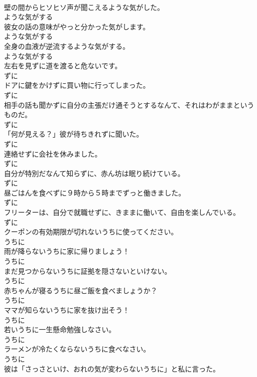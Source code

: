 \documentclass[8pt]{extreport}
\begin{document}
\begin{CJK}{UTF8}{min}
\\	壁の間からヒソヒソ声が聞こえるような気がした。	
\\	ような気がする	
\\	彼女の話の意味がやっと分かった気がします。	
\\	ような気がする	
\\	全身の血液が逆流するような気がする。	
\\	ような気がする	
\\	左右を見ずに道を渡ると危ないです。	
\\	ずに	
\\	ドアに鍵をかけずに買い物に行ってしまった。	
\\	ずに	
\\	相手の話も聞かずに自分の主張だけ通そうとするなんて、それはわがままというものだ。	
\\	ずに	
\\	「何が見える？」彼が待ちきれずに聞いた。	
\\	ずに	
\\	連絡せずに会社を休みました。	
\\	ずに	
\\	自分が特別だなんて知らずに、赤ん坊は眠り続けている。	
\\	ずに	
\\	昼ごはんを食べずに９時から５時までずっと働きました。	
\\	ずに	
\\	フリーターは、自分で就職せずに、きままに働いて、自由を楽しんでいる。	
\\	ずに	
\\	クーポンの有効期限が切れないうちに使ってください。	
\\	うちに	
\\	雨が降らないうちに家に帰りましょう！	
\\	うちに	
\\	まだ見つからないうちに証拠を隠さないといけない。	
\\	うちに	
\\	赤ちゃんが寝るうちに昼ご飯を食べましょうか？	
\\	うちに	
\\	ママが知らないうちに家を抜け出そう！	
\\	うちに	
\\	若いうちに一生懸命勉強しなさい。	
\\	うちに	
\\	ラーメンが冷たくならないうちに食べなさい。	
\\	うちに	
\\	彼は「さっさといけ、おれの気が変わらないうちに」と私に言った。	

\end{CJK}
\end{document}
